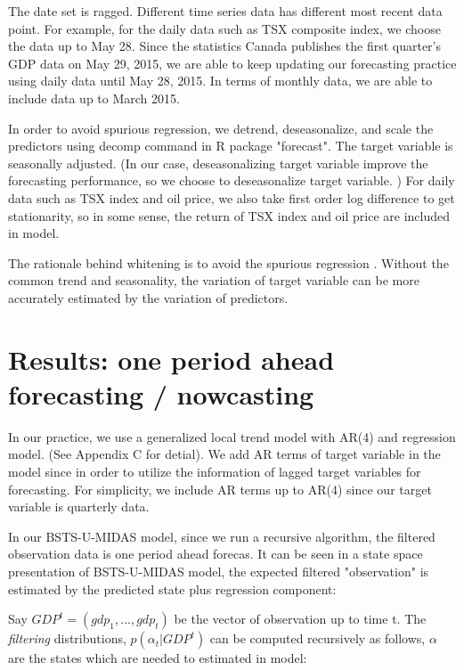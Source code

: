 The date set is ragged. Different time series data has different most recent data point. For example, for the daily data such as TSX composite index, we choose the data up to May 28. Since the statistics Canada publishes the first quarter's GDP data on May 29, 2015, we are able to keep updating our forecasting practice using daily data until May 28, 2015. In terms of monthly data, we are able to include data up to March 2015.  


In order to avoid spurious regression, we detrend, deseasonalize, and scale the predictors using decomp command in R package "forecast". The target variable is seasonally adjusted. (In our case, deseasonalizing target variable improve the forecasting performance, so we choose to deseasonalize target variable. ) For daily data such as TSX index and oil price, we also take first order log difference to get stationarity, so in some sense, the return of TSX index and oil price are included in model. 

The rationale behind whitening is to avoid the spurious regression \cite{Scott2014}. Without the common trend and seasonality, the variation of target variable can be more accurately estimated by the variation of predictors. 



\section{Results: one period ahead forecasting / nowcasting}



In our practice, we use a generalized local trend model with AR(4) and regression model. (See Appendix C for detial). We add AR terms of target variable in the model since in order to utilize the information of lagged target variables for forecasting. For simplicity, we include AR terms up to AR(4) since our target variable is quarterly data. 


In our BSTS-U-MIDAS model, since we run a recursive algorithm, the filtered observation data is one period ahead forecas. It can be seen in a state space presentation of BSTS-U-MIDAS model, the expected filtered "observation" is estimated by the predicted state plus regression component:

Say $ GDP^t = (gdp_1, ..., gdp_t) $ be the vector of observation up to time t. The \textit{filtering} distributions, $p(\alpha_t|GDP^{t}) $ can be computed recursively as follows, $\alpha$ are the states which are needed to estimated in model:

